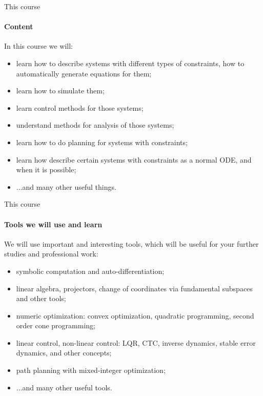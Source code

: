 \documentclass{beamer}
\begin{document}
\begin{frame}{This course}
\framesubtitle{Content}
\begin{flushleft}

In this course we will:

\begin{itemize}
    \item learn how to describe systems with different types of constraints, how to automatically generate equations for them;
    \item learn how to simulate them;
    \item learn control methods for those systems;
    \item understand methods for analysis of those systems;
    \item learn how to do planning for systems with constraints;
    \item learn how describe certain systems with constraints as a normal ODE, and when it is possible;
    \item ...and many other useful things.
\end{itemize}


\end{flushleft}
\end{frame}




\begin{frame}{This course}
\framesubtitle{Tools we will use and learn}
\begin{flushleft}

We will use important and interesting tools, which will be useful for your further studies and professional work:

\begin{itemize}
    \item symbolic computation and auto-differentiation;
    \item linear algebra, projectors, change of coordinates via fundamental subspaces and other tools;
    \item numeric optimization: convex optimization, quadratic programming, second order cone programming;
    \item linear control, non-linear control: LQR, CTC, inverse dynamics, stable error dynamics, and other concepts;
    \item path planning with mixed-integer optimization;
    \item ...and many other useful tools.
\end{itemize}


\end{flushleft}
\end{frame}
\end{document}
